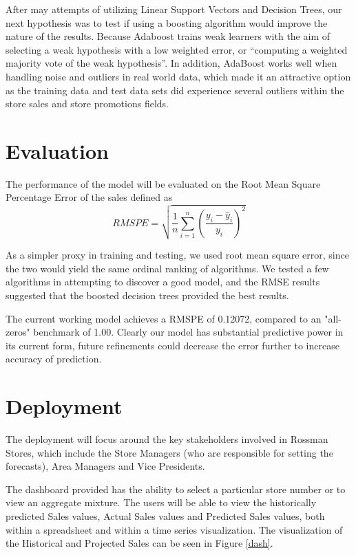 \documentclass[DIV=calc, paper=a4, fontsize=11pt]{scrartcl}	 %
\begin{document}
After may attempts of utilizing Linear Support Vectors and Decision Trees, our next hypothesis was to test if using a boosting algorithm would improve the nature of the results.  Because Adaboost trains weak learners with the aim of selecting a weak hypothesis with a low weighted error, or “computing a weighted majority vote of the weak hypothesis”.\cite{Schapire} In addition, AdaBoost works well when handling noise and outliers in real world data, which made it an attractive option as the training data and test data sets did experience several outliers within the store sales and store promotions fields.


\section*{Evaluation}
The performance of the model will be evaluated on the Root Mean Square Percentage Error of the sales defined as 
\[
RMSPE = \sqrt{\frac{1}{n}\sum_{i=1}^n \left(\frac{y_i - \hat{y}_i}{y_i}\right)^2}
\]

As a simpler proxy in training and testing, we used root mean square error, since the two would yield the same ordinal ranking of algorithms. We tested a few algorithms in attempting to discover a good model, and the RMSE results suggested that the boosted decision trees provided the best results. 

The current working model achieves a RMSPE of 0.12072, compared to an "all-zeros" benchmark of 1.00. Clearly our model has substantial predictive power in its current form, future refinements could decrease the error further to increase accuracy of prediction.


\section*{Deployment}
The deployment will focus around the key stakeholders involved in Rossman Stores, which include the Store Managers (who are responsible for setting the forecasts), Area Managers and Vice Presidents. 

The dashboard provided has the ability to select a particular store number or to view an aggregate mixture. The users will be able to view the historically predicted Sales values, Actual Sales values and Predicted Sales values, both within a spreadsheet and within a time series visualization. The visualization of the Historical and Projected Sales can be seen in Figure \ref{dash}. 
\end{document}
